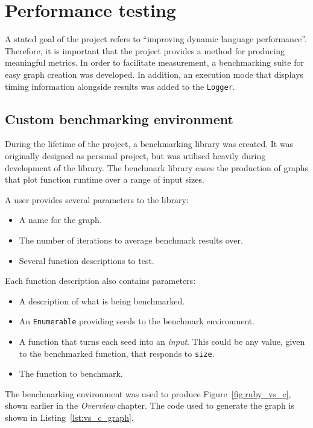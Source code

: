 \section{Performance testing}
A stated goal of the project refers to ``improving dynamic language performance''.
Therefore, it is important that the project provides a method for producing meaningful metrics.
In order to facilitate measurement, a benchmarking suite for easy graph creation was developed.
In addition, an execution mode that displays timing information alongside results was added to the \verb|Logger|.

\subsection{Custom benchmarking environment}
During the lifetime of the project, a benchmarking library was created. It was originally designed as personal project, but was utilised heavily during development of the library.  The benchmark library eases the production of graphs that plot function runtime over a range of input sizes.

A user provides several parameters to the library:
\begin{itemize}
\item A name for the graph.
\item The number of iterations to average benchmark results over.
\item Several function descriptions to test.
\end{itemize}

Each function description also contains parameters:
\begin{itemize}
\item A description of what is being benchmarked.
\item An \verb|Enumerable| providing seeds to the benchmark environment.
\item A function that turns each seed into an \emph{input}. This could be any value, given to the benchmarked function, that responds to \verb|size|.
\item The function to benchmark.
\end{itemize}

The benchmarking environment was used to produce Figure~\ref{fig:ruby_vs_c}, shown earlier in the \emph{Overview} chapter. The code used to generate the graph is shown in Listing~\ref{lst:vs_c_graph}.


